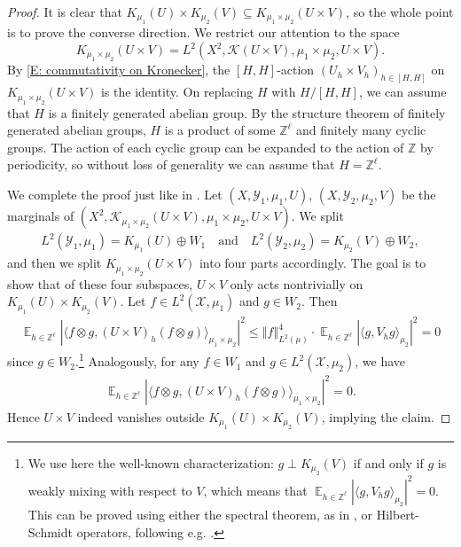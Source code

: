 \documentclass[11pt]{amsart}
\theoremstyle{definition}
\DeclareMathOperator*{\E}{\mathbb{E}}
\newcommand{\Z}{{\mathbb Z}}
\newcommand{\CK}{{\mathcal K}}
\newcommand{\CX}{{\mathcal X}}
\newcommand{\CY}{{\mathcal Y}}
\newcommand{\norm}[1]{\left\Vert #1\right\Vert}
\newcommand{\1}{{\mathbf{1}}}
\newcommand{\abs}[1]{\mathopen{}\left| #1\mathclose{}\right|}
\begin{document}
\begin{proof}
    It is clear that $K_{\mu_{1}}(U)\times K_{\mu_{2}}(V)\subseteq K_{\mu_{1}\times\mu_{2}}(U\times V)$, so the whole point is to prove the converse direction. 
    We restrict our attention to the space $$K_{\mu_{1}\times\mu_{2}}(U\times V) = L^2(X^2,\CK(U\times V), \mu_{1}\times \mu_{2}, U\times V).$$ %
    By \eqref{E: commutativity on Kronecker}, the $[H,H]$-action $(U_h\times V_h)_{h\in[H,H]}$ on $K_{\mu_{1}\times\mu_{2}}(U\times V)$ is the identity. On replacing $H$ with $H/[H,H]$, we can assume that $H$ is a finitely generated abelian group. By the structure theorem of finitely generated abelian groups, $H$ is a product of some $\Z^\ell$ and finitely many cyclic groups. The action of each cyclic group can be expanded to the action of $\Z$ by periodicity, so without loss of generality we can assume that $H = \Z^\ell$.

    We complete the proof just like in \cite[Chapter 4.4]{Fu81}. Let $(X,\CY_1, \mu_{1}, U)$, $(X,\CY_2, \mu_{2}, V)$ be the marginals of $(X^2,\CK_{\mu_{1}\times\mu_{2}}(U\times V), \mu_{1}\times\mu_{2}, U\times V)$. We split
    \begin{align*}
        L^2(\CY_1, \mu_{1}) = K_{\mu_{1}}(U) \oplus W_1\quad \textrm{and}\quad L^2(\CY_2, \mu_{2}) = K_{\mu_{2}}(V) \oplus W_2,
    \end{align*}
    and then we split $K_{\mu_{1}\times\mu_{2}}(U\times V)$ into four parts accordingly. The goal is to show that of these four subspaces, $U\times V$ only acts nontrivially on $K_{\mu_{1}}(U)\times K_{\mu_{2}}(V)$. Let $f\in L^2(\CX, \mu_{1})$ and $g\in W_2$.
    Then
    \begin{align*}
        \E_{h\in\Z^\ell}\abs{\langle f\otimes g, (U\times V)_h(f\otimes g)\rangle_{\mu_{1}\times\mu_{2}}}^2\leq \norm{f}_{L^2(\mu)}^4\cdot\E_{h\in\Z^\ell}\abs{\langle g, V_h g\rangle_{\mu_{2}}}^2 = 0
    \end{align*}
    since $g\in W_2$.\footnote{We use here the well-known characterization: $g\perp K_{\mu_{2}}(V)$ if and only if $g$ is weakly mixing with respect to $V$, which means that $\E_{h\in\Z^\ell}\abs{\langle g, V_h g\rangle_{\mu_{2}}}^2 = 0.$ This can be proved using either the spectral theorem, as in \cite[Lemma~4.15]{Fu81}, or Hilbert-Schmidt operators, following e.g. \cite[Section 2.12]{TaoPoincare}.} Analogously, for any $f\in W_1$ and $g\in L^2(\CX, {\mu_{2}})$, we have
    \begin{align*}
        \E_{h\in\Z^\ell}\abs{\langle f\otimes g, (U\times V)_h(f\otimes g)\rangle_{\mu_{1}\times\mu_{2}}}^2 = 0.
    \end{align*}
    Hence $U\times V$ indeed vanishes outside $K_{\mu_{1}}(U)\times K_{\mu_{2}}(V)$, implying the claim. 
\end{proof}
\end{document}
